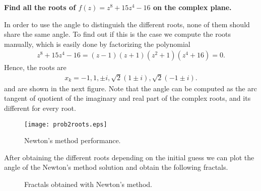 \textbf{Find all the roots of $f(z) = z^8 + 15z^4 − 16$ on the complex plane.}

\vspace{0.3in}

In order to use the angle to distinguish the different roots, none of them should share the same angle. To find out if this is the case we compute the roots manually, which is easily done by factorizing the polynomial
\begin{align*}
z^8 + 15z^4 − 16=(z-1)(z+1)(z^2+1)(z^4+16)=0.
\end{align*}
Hence, the roots are
\begin{align*}
x_k=-1,1,\pm i,\sqrt{2}(1\pm i),\sqrt{2}(-1\pm i).
\end{align*}
and are shown in the next figure. Note that the angle can be computed as the arc tangent of quotient of the imaginary and real part of the complex roots, and its different for every root.
\begin{figure}[H]
\centering     %
{\texttt{[image: prob2roots.eps]}}
\caption{Newton's method performance.}
\end{figure}

After obtaining the different roots depending on the initial guess we can plot the angle of the Newton's method solution and obtain the following fractals.

\begin{figure}[H]
\centering     %
\hspace*{\fill}
\hspace*{\fill}
\hspace*{\fill}
\caption{Fractals obtained with Newton's method.}
\end{figure}
